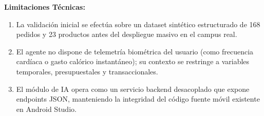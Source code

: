 \documentclass{article}
\begin{document}
\textbf{Limitaciones Técnicas:}
\begin{enumerate}
    \item La validación inicial se efectúa sobre un dataset sintético estructurado de 168 pedidos y 23 productos antes del despliegue masivo en el campus real.
    \item El agente no dispone de telemetría biométrica del usuario (como frecuencia cardíaca o gasto calórico instantáneo); su contexto se restringe a variables temporales, presupuestales y transaccionales.
    \item El módulo de IA opera como un servicio backend desacoplado que expone endpoints JSON, manteniendo la integridad del código fuente móvil existente en Android Studio.
\end{enumerate}

\printbibliography

\newpage
\thispagestyle{empty}
\vspace*{0.3\textwidth}

\begin{figure}[H]
  \centering
  
\end{figure}
\end{document}

